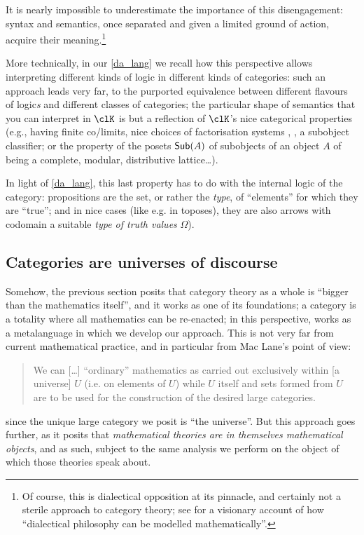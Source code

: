 It is nearly impossible to underestimate the importance of this disengagement: syntax and semantics, once separated and given a limited ground of action, acquire their meaning.\footnote{Of course, this is dialectical opposition at its pinnacle, and certainly not a sterile approach to category theory; see \cite{lawvere1996unity} for a visionary account of how ``dialectical philosophy can be modelled mathematically''.}

More technically, in our \autoref{da_lang} we recall how this perspective allows interpreting different kinds of logic in different kinds of categories: such an approach leads very far, to the purported equivalence between different flavours of logic\emph{s} and different classes of categories; the particular shape of semantics that you can interpret in $\clK$ is but a reflection of $\clK$'s nice categorical properties (e.g., having finite co/limits, nice choices of factorisation systems \cite[5.5]{Bor1}, \cite{FK}, a subobject classifier; or the property of the posets $\mathsf{Sub}(A)$ of subobjects of an object $A$ of being a complete, modular, distributive lattice\dots).

In light of \autoref{da_lang}, this last property has to do with the internal logic of the category: propositions are the set, or rather the \emph{type}, of ``elements'' for which they are ``true''; and in nice cases (like e.g. in toposes), they are also arrows with codomain a suitable \emph{type of truth values} $\Omega$).
\subsection{Categories are universes of discourse}
Somehow, the previous section posits that category theory as a whole is ``bigger than the mathematics itself'', and it works as one of its foundations; a category is a totality where all mathematics can be re-enacted; in this perspective,  works as a metalanguage in which we develop our approach. This is not very far from current mathematical practice, and in particular from Mac Lane's point of view:
\begin{quote}
    We can [\dots\unkern] ``ordinary'' mathematics as carried out exclusively within [a universe] $U$ (i.e. on elements of $U$) while $U$ itself and sets formed from $U$ are to be used for the construction of the desired large categories.\hfill \cite[I.6]{McL}
\end{quote}
since the unique large category we posit is ``the universe''. But this approach goes further, as it posits that \emph{mathematical theories are in themselves mathematical objects}, and as such, subject to the same analysis we perform on the object of which those theories speak about.

